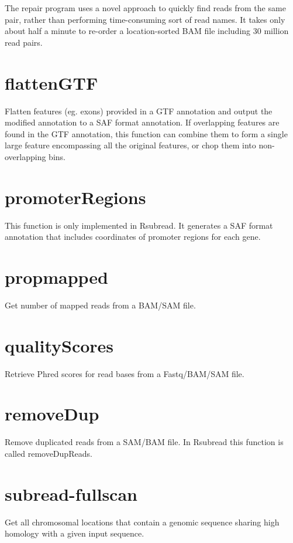 \documentclass[12pt]{report}
\newcommand{\Rsubread}{\textsf{Rsubread}}
\newcommand{\repair}{\textsf{repair}}
\begin{document}
The {\repair} program uses a novel approach to quickly find reads from the same pair, rather than performing time-consuming sort of read names.
It takes only about half a minute to re-order a location-sorted BAM file including 30 million read pairs.

\section{flattenGTF}

Flatten features (eg. exons) provided in a GTF annotation and output the modified annotation to a SAF format annotation.
If overlapping features are found in the GTF annotation, this function can combine them to form a single large feature encompassing all the original features, or chop them into non-overlapping bins. 

\section{promoterRegions}

This function is only implemented in {\Rsubread}. It generates a SAF format annotation that includes coordinates of promoter regions for each gene.

\section{propmapped}

Get number of mapped reads from a BAM/SAM file.

\section{qualityScores}

Retrieve Phred scores for read bases from a Fastq/BAM/SAM file.

\section{removeDup}

Remove duplicated reads from a SAM/BAM file. 
In {\Rsubread} this function is called \textsf{removeDupReads}.

\section{subread-fullscan}

Get all chromosomal locations that contain a genomic sequence sharing high homology with a given input sequence.
\end{document}
